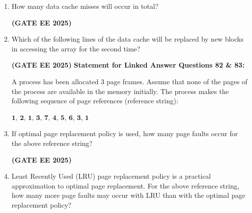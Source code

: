 \documentclass[journal,12pt,onecolumn]{IEEEtran}
\theoremstyle{remark}
\begin{document}
\begin{enumerate}
    
    \item How many data cache misses will occur in total?
    \begin{enumerate}
    \end{enumerate}
\hfill \textbf{(GATE EE 2025)}
    \item Which of the following lines of the data cache will be replaced by new blocks in accessing the array for the second time?
    \begin{enumerate}
    \end{enumerate}

\hfill \textbf{(GATE EE 2025)}
\newline
\textbf{Statement for Linked Answer Questions 82 \& 83:}  

A process has been allocated 3 page frames. Assume that none of the pages of the process are available in the memory initially. The process makes the following sequence of page references (reference string):  

$\textbf{1, 2, 1, 3, 7, 4, 5, 6, 3, 1}$



    
    \item If optimal page replacement policy is used, how many page faults occur for the above reference string?
    \begin{enumerate}
    \end{enumerate}
\hfill \textbf{(GATE EE 2025)}
    \item Least Recently Used (LRU) page replacement policy is a practical approximation to optimal page replacement. For the above reference string, how many more page faults may occur with LRU than with the optimal page replacement policy?
    \begin{enumerate}
    \begin{multicols}{4}
        

\end{multicols}
\end{enumerate}
\end{enumerate}
\end{document}
